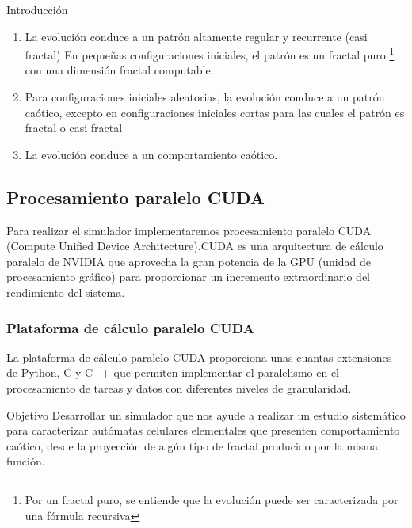 \documentclass{article}
\begin{document}
\begin{section}{Introducción}
\begin{enumerate}
            \item La evolución conduce a un patrón altamente regular y recurrente (casi fractal)  En pequeñas configuraciones iniciales, el patrón es un fractal puro \footnote{Por un fractal puro, se entiende que la evolución puede ser caracterizada por una fórmula recursiva} con una dimensión fractal computable.

            \item Para configuraciones iniciales aleatorias, la evolución conduce a un patrón caótico, excepto en configuraciones iniciales cortas para las cuales el patrón es fractal o casi fractal 

            \item La evolución conduce a un comportamiento caótico.
            
        \end{enumerate}
        
        \subsection{Procesamiento paralelo CUDA}
            \noindent Para realizar el simulador implementaremos procesamiento paralelo CUDA (Compute Unified Device Architecture).CUDA es una arquitectura de cálculo paralelo de NVIDIA que aprovecha la gran potencia de la GPU (unidad de procesamiento gráfico) para proporcionar un incremento extraordinario del rendimiento del sistema.
       \subsubsection{Plataforma de cálculo paralelo CUDA}
            \noindent La plataforma de cálculo paralelo CUDA proporciona unas cuantas extensiones de Python, C y C++ que permiten implementar el paralelismo en el procesamiento de tareas y datos con diferentes niveles de granularidad.\\
    \end{section}
    
    \newpage
    
    \begin{section}{Objetivo}
        \noindent Desarrollar un simulador que nos ayude a realizar un estudio sistemático para caracterizar autómatas celulares elementales que presenten comportamiento caótico, desde la proyección de algún tipo de fractal producido por la misma función. 
    \end{section}
    
\end{document}
